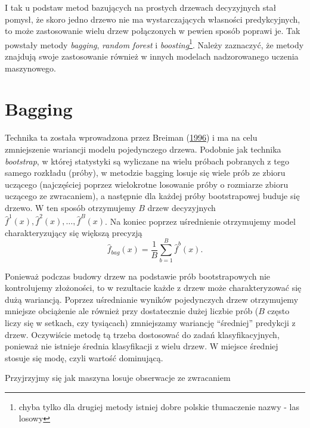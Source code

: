 \documentclass[]{book}
\let\rmarkdownfootnote\footnote%
\def\footnote{\protect\rmarkdownfootnote}
\theoremstyle{plain}
\theoremstyle{definition}
\theoremstyle{definition}
\theoremstyle{definition}
\theoremstyle{definition}
\theoremstyle{remark}
\begin{document}
I tak u podstaw metod bazujących na prostych drzewach decyzyjnych stał pomysł, że skoro jedno drzewo nie ma wystarczających własności predykcyjnych, to może zastosowanie wielu drzew połączonych w pewien sposób poprawi je. Tak powstały metody \emph{bagging}, \emph{random forest} i \emph{boosting}\footnote{chyba tylko dla drugiej metody istniej dobre polskie tłumaczenie nazwy - las losowy}. Należy zaznaczyć, że metody znajdują swoje zastosowanie również w innych modelach nadzorowanego uczenia maszynowego.

\hypertarget{bagging}{%
\section{Bagging}\label{bagging}}

Technika ta została wprowadzona przez Breiman (\protect\hyperlink{ref-breiman1996}{1996}) i ma na celu zmniejszenie wariancji modelu pojedynczego drzewa. Podobnie jak technika \emph{bootstrap}, w której statystyki są wyliczane na wielu próbach pobranych z tego samego rozkładu (próby), w metodzie bagging losuje się wiele prób ze zbioru uczącego (najczęściej poprzez wielokrotne losowanie próby o rozmiarze zbioru uczącego ze zwracaniem), a następnie dla każdej próby bootstrapowej buduje się drzewo. W ten sposób otrzymujemy \(B\) drzew decyzyjnych \(\hat{f}^1(x), \hat{f}^2(x),\ldots, \hat{f}^B(x)\). Na koniec poprzez uśrednienie otrzymujemy model charakteryzujący się większą precyzją
\begin{equation}
    \hat{f}_{bag}(x)=\frac1B\sum_{b=1}^B\hat{f}^b(x).
\end{equation}

Ponieważ podczas budowy drzew na podstawie prób bootstrapowych nie kontrolujemy złożoności, to w rezultacie każde z drzew może charakteryzować się dużą wariancją. Poprzez uśrednianie wyników pojedynczych drzew otrzymujemy mniejsze obciążenie ale również przy dostatecznie dużej liczbie prób (\(B\) często liczy się w setkach, czy tysiącach) zmniejszamy wariancję ``średniej'' predykcji z drzew. Oczywiście metodę tą trzeba dostosować do zadań klasyfikacyjnych, ponieważ nie istnieje średnia klasyfikacji z wielu drzew. W miejsce średniej stosuje się modę, czyli wartość dominującą.

Przyjrzyjmy się jak maszyna losuje obserwacje ze zwracaniem
\end{document}
